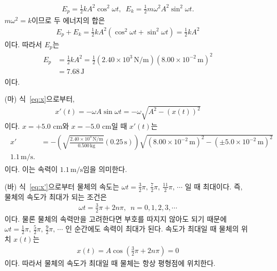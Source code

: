 \documentclass[floatfix,nofootinbib,superscriptaddress,fleqn]{revtex4-2}
\begin{document}
\begin{itemize}
  \begin{align}
    E_p = \frac{1}{2}kA^2\cos^2\omega t,\,\,\,
    E_k = \frac{1}{2}m\omega^2A^2\sin^2\omega t.
  \end{align}
  $m\omega^2=k$이므로 두 에너지의 합은
  \begin{align}
    E_p +  E_k = \frac{1}{2}kA^2(\cos^2\omega t+\sin^2\omega t)
    =\frac{1}{2}kA^2
  \end{align}
  이다. 따라서 $E_p$는
  \begin{align}
    \begin{split}
      E_p &= \frac{1}{2}kA^2 = \frac{1}{2}
      (2.40\times 10^3\,\mathrm{N/m})
      (8.00\times 10^{-2}\,\mathrm{m})^2  \\
      &= 7.68\,\mathrm{J}
    \end{split}
  \end{align}
  이다.

  \item[(마)] 
  식~\eqref{eq:x}으로부터,
  \begin{align}\label{eq:x'}
    x'(t) = -\omega A\sin\omega t = -\omega\sqrt{A^2-(x(t))^2}
  \end{align}
  이다. $x=+5.0$ cm와 $x=-5.0$ cm일 때 $x'(t)$는 
  \begin{align}
    \begin{split}
      x' &= -\left(
        \sqrt{\frac{2.40\times 10^3\,\mathrm{N/m}}{0.500\,\mathrm{kg}}}
        (0.25\,\mathrm{s})\right)
        \sqrt{(8.00\times 10^{-2}\,\mathrm{m})^2
        -(\pm 5.0\times 10^{-2}\,\mathrm{m})^2} \\
      1.1\,\mathrm{m/s}.
    \end{split}
  \end{align}
  이다. 이는 속력이 $1.1\,\mathrm{m/s}$임을 의미한다.
  \item[(바)] 
  식~\eqref{eq:x'}으로부터 물체의 속도는 
  $\omega t = \frac{3}{2}\pi,\,\frac{7}{2}\pi,\,\frac{11}{2}\pi,\,\cdots$
  일 때 최대이다. 즉, 물체의 속도가 최대가 되는 조건은
  \begin{align}
    \omega t = \frac{3}{2}\pi+2n\pi,\,\,\,n=0,1,2,3,\cdots
  \end{align}
  이다. 물론 물체의 속력만을 고려한다면 부호를 따지지 않아도 되기 때문에
  $\omega t = \frac{1}{2}\pi,\,\frac{5}{2}\pi,\,\frac{9}{2}\pi,\,\cdots$
  인 순간에도 속력이 최대가 된다. 속도가 최대일 때 물체의 위치 $x(t)$는 
  \begin{align}
    x(t) = A\cos\left(\frac{3}{2}\pi+2n\pi\right) = 0
  \end{align}
  이다. 따라서 물체의 속도가 최대일 때 물체는 항상 평형점에 위치한다.
 \end{itemize}
\end{document}
